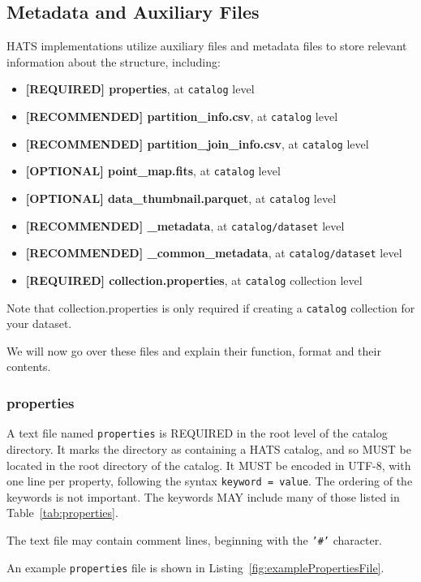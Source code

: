 \documentclass[11pt,a4paper]{ivoa}
\begin{document}
\subsection{Metadata and Auxiliary Files} \label{sec:meta}
HATS implementations utilize auxiliary files and metadata files to store relevant information about the  structure, including:
\begin{itemize}
    \item \textbf{[REQUIRED] properties}, at  \texttt{catalog} level    
    \item \textbf{[RECOMMENDED] partition\_info.csv}, at  \texttt{catalog} level
    \item \textbf{[RECOMMENDED] partition\_join\_info.csv}, at  \texttt{catalog} level
    \item \textbf{[OPTIONAL] point\_map.fits}, at  \texttt{catalog} level
    \item \textbf{[OPTIONAL] data\_thumbnail.parquet}, at  \texttt{catalog} level
    \item \textbf{[RECOMMENDED] \_metadata}, at  \texttt{catalog/dataset} level
    \item \textbf{[RECOMMENDED] \_common\_metadata}, at  \texttt{catalog/dataset} level
    \item \textbf{[REQUIRED] collection.properties}, at  \texttt{catalog} collection level
\end{itemize}
    
Note that collection.properties is only required if creating a \texttt{catalog} collection for your dataset. \par 
We will now go over these files and explain their function, format and their contents. 
    
\subsubsection{properties} 

A text file named \texttt{properties} is REQUIRED in the root level of the catalog directory.
It marks the directory as containing a HATS catalog, and so MUST be located in the root directory of the catalog.
It MUST be encoded in UTF-8, with one line per property, following the syntax \texttt{keyword = value}.
The ordering of the keywords is not important. The keywords MAY include many of those listed in Table~\ref{tab:properties}.

The text file may contain comment lines, beginning with the \texttt{'\#'} character.

An example \texttt{properties} file is shown in Listing~\ref{fig:examplePropertiesFile}.
\end{document}
